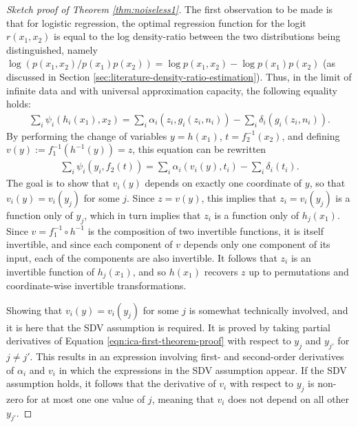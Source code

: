 \begin{proof}[Sketch proof of Theorem \ref{thm:noiseless1}]
The first observation to be made is that for logistic regression, the optimal regression function for the logit $r(x_1, x_2)$ is equal to the log density-ratio between the two distributions being distinguished, namely $\log\left( p(x_1, x_2) / p(x_1)p(x_2)\right) = \log p(x_1, x_2) - \log p(x_1)p(x_2)$ (as discussed in Section \ref{sec:literature-density-ratio-estimation}).
Thus, in the limit of infinite data and with universal approximation capacity, the following equality holds:
%
\begin{align*}
\sum_{i}\psi_{i}(h_{i}({x}_{1}),{x}_{2}) = \sum_i \alpha_i(z_i, g_i(z_i, n_i)) - \sum_i \delta_i(g_i(z_i, n_i)).
\end{align*}
%
By performing the change of variables $y=h(x_1)$, $t=f_2^{-1}(x_2)$, and defining $v(y) := f_1^{-1}(h^{-1}(y)) = z$, this equation can be rewritten
%
\begin{align}
\sum_{i}\psi_{i}(y_i,f_2(t)) = \sum_i \alpha_i(v_i(y), t_i) - \sum_i \delta_i(t_i). \label{eqn:ica-first-theorem-proof}
\end{align}
%
The goal is to show that $v_i(y)$ depends on exactly one coordinate of $y$, so that $v_i(y) = v_i(y_j)$ for some $j$. 
Since $z = v(y)$, this implies that $z_i = v_i(y_j)$ is a function only of $y_j$, which in turn implies that $z_i$ is a function only of $h_j(x_1)$. 
Since $v = f_1^{-1} \circ h^{-1}$ is the composition of two invertible functions, it is itself invertible, and since each component of $v$ depends only one component of its input, each of the components are also invertible.
It follows that $z_i$ is an invertible function of $h_j(x_1)$, and so $h(x_1)$ recovers $z$ up to permutations and coordinate-wise invertible transformations.

Showing that $v_i(y) = v_i(y_j)$ for some $j$ is somewhat technically involved, and it is here that the SDV assumption is required.
It is proved by taking partial derivatives of Equation \ref{eqn:ica-first-theorem-proof} with respect to $y_j$ and $y_{j'}$ for $j\not=j'$. 
This results in an expression involving first- and second-order derivatives of $\alpha_i$ and $v_i$ in which the expressions in the SDV assumption appear. 
If the SDV assumption holds, it follows that the derivative of $v_i$ with respect to $y_j$ is non-zero for at most one one value of $j$, meaning that $v_i$ does not depend on all other $y_{j'}$. 
\end{proof}


